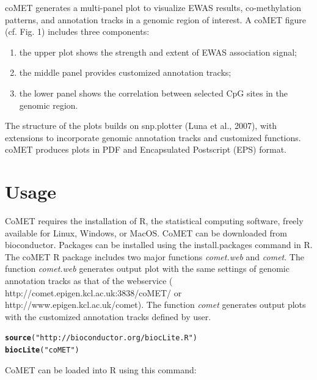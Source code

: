 \documentclass[11pt]{article}\usepackage[]{graphicx}\usepackage[usenames,dvipsnames]{color}
\makeatletter
\newcommand{\hlstr}[1]{\textcolor[rgb]{0.192,0.494,0.8}{#1}}%
\newcommand{\hlstd}[1]{\textcolor[rgb]{0.345,0.345,0.345}{#1}}%
\newcommand{\hlkwd}[1]{\textcolor[rgb]{0.737,0.353,0.396}{\textbf{#1}}}%
\newenvironment{kframe}{%
 \def\at@end@of@kframe{}%
 \ifinner\ifhmode%
  \def\at@end@of@kframe{\end{minipage}}%
  \begin{minipage}{\columnwidth}%
 \fi\fi%
 \def\FrameCommand##1{\hskip\@totalleftmargin \hskip-\fboxsep
 \colorbox{shadecolor}{##1}\hskip-\fboxsep
     \hskip-\linewidth \hskip-\@totalleftmargin \hskip\columnwidth}%
 \MakeFramed {\advance\hsize-\width
   \@totalleftmargin\z@ \linewidth\hsize
   \@setminipage}}%
 {\par\unskip\endMakeFramed%
 \at@end@of@kframe}
\newenvironment{knitrout}{}{} %
\makeatother
\begin{document}
coMET generates a multi-panel plot to visualize EWAS results, co-methylation patterns, and annotation tracks in a genomic region of interest. A coMET figure (cf. Fig. 1) includes three components: 
\begin{enumerate}
  \item the upper plot shows the strength and extent of EWAS association signal;
  \item the middle panel provides customized annotation tracks;
  \item the lower panel shows the correlation between selected CpG sites in the genomic region.
\end{enumerate}
The structure of the plots builds on snp.plotter (Luna et al., 2007), with extensions to incorporate genomic annotation tracks and customized functions. coMET produces plots in PDF and Encapsulated Postscript (EPS) format.


\section{Usage}
CoMET requires the installation of R, the statistical computing software, freely available for Linux, Windows, or MacOS. CoMET can be downloaded from bioconductor. Packages can be installed using the install.packages command in R. The coMET R package includes two major functions \emph{comet.web} and \emph{comet}. The function \emph{comet.web} generates output plot with the same settings of genomic annotation tracks as that of the webservice ( http://comet.epigen.kcl.ac.uk:3838/coMET/ or http://www.epigen.kcl.ac.uk/comet). The function \emph{comet} generates output plots with the customized annotation tracks defined by user. 

\begin{knitrout}
\color{fgcolor}\begin{kframe}
\begin{alltt}
\hlkwd{source}\hlstd{(}\hlstr{"http://bioconductor.org/biocLite.R"}\hlstd{)}
\hlkwd{biocLite}\hlstd{(}\hlstr{"coMET"}\hlstd{)}
\end{alltt}
\end{kframe}
\end{knitrout}

CoMET can be loaded into R using this command:
\end{document}
